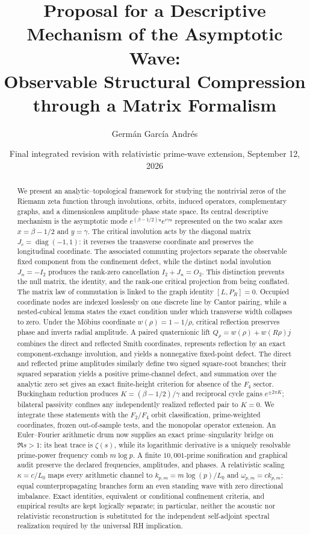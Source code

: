 \documentclass[11pt]{amsart}
\title[Asymptotic Wave and Matrix Compression]{Proposal for a Descriptive Mechanism of the Asymptotic Wave:\\ Observable Structural Compression through a Matrix Formalism}
\author{Germán García Andrés}
\date{Final integrated revision with relativistic prime-wave extension, September 12, 2026}
\theoremstyle{definition}
\theoremstyle{remark}
\begin{document}
\begin{abstract}
We present an analytic--topological framework for studying the nontrivial zeros of the Riemann zeta function through involutions, orbits, induced operators, complementary graphs, and a dimensionless amplitude--phase state space.  Its central descriptive mechanism is the asymptotic mode $e^{(\beta-1/2)u}e^{i\gamma u}$ represented on the two scalar axes $x=\beta-1/2$ and $y=\gamma$.  The critical involution acts by the diagonal matrix $J_c=\operatorname{diag}(-1,1)$: it reverses the transverse coordinate and preserves the longitudinal coordinate.  The associated commuting projectors separate the observable fixed component from the confinement defect, while the distinct nodal involution $J_n=-I_2$ produces the rank-zero cancellation $I_2+J_n=O_2$.  This distinction prevents the null matrix, the identity, and the rank-one critical projection from being conflated.  The matrix law of commutation is linked to the graph identity $[L,P_R]=0$.  Occupied coordinate nodes are indexed losslessly on one discrete line by Cantor pairing, while a nested-cubical lemma states the exact condition under which transverse width collapses to zero.  Under the M\"obius coordinate $w(\rho)=1-1/\rho$, critical reflection preserves phase and inverts radial amplitude.  A paired quaternionic lift $Q_\rho=w(\rho)+w(R\rho)j$ combines the direct and reflected Smith coordinates, represents reflection by an exact component-exchange involution, and yields a nonnegative fixed-point defect.  The direct and reflected prime amplitudes similarly define two signed square-root branches; their squared separation yields a positive prime-channel defect, and summation over the analytic zero set gives an exact finite-height criterion for absence of the $F_4$ sector.  Buckingham reduction produces $K=(\beta-1/2)/\gamma$ and reciprocal cycle gains $e^{\pm2\pi K}$; bilateral passivity confines any independently realized reflected pair to $K=0$.  We integrate these statements with the $F_2/F_4$ orbit classification, prime-weighted coordinates, frozen out-of-sample tests, and the monopolar operator extension.  An Euler--Fourier arithmetic drum now supplies an exact prime--singularity bridge on $\Re s>1$: its heat trace is $\zeta(s)$, while its logarithmic derivative is a uniquely resolvable prime-power frequency comb $m\log p$.  A finite $10{,}001$-prime sonification and graphical audit preserve the declared frequencies, amplitudes, and phases.  A relativistic scaling $\kappa=c/L_0$ maps every arithmetic channel to $k_{p,m}=m\log(p)/L_0$ and $\omega_{p,m}=ck_{p,m}$; equal counterpropagating branches form an even standing wave with zero directional imbalance.  Exact identities, equivalent or conditional confinement criteria, and empirical results are kept logically separate; in particular, neither the acoustic nor relativistic reconstruction is substituted for the independent self-adjoint spectral realization required by the universal RH implication.
\end{abstract}
\end{document}
